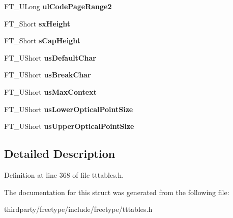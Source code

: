 \begin{DoxyCompactItemize}
\item 
\mbox{\label{struct_t_t___o_s2___ad117c64d73d15d1304c75fb5f41f1124}} 
F\+T\+\_\+\+U\+Long {\bfseries ul\+Code\+Page\+Range2}
\item 
\mbox{\label{struct_t_t___o_s2___a2eb3bb1392461a536c393304bde72835}} 
F\+T\+\_\+\+Short {\bfseries sx\+Height}
\item 
\mbox{\label{struct_t_t___o_s2___ac755913b648d535d1207927e4a6f1ec0}} 
F\+T\+\_\+\+Short {\bfseries s\+Cap\+Height}
\item 
\mbox{\label{struct_t_t___o_s2___af8639fefeb705a9287df996b224462ea}} 
F\+T\+\_\+\+U\+Short {\bfseries us\+Default\+Char}
\item 
\mbox{\label{struct_t_t___o_s2___a1d47030e246d2593ec3e4cdf66b17161}} 
F\+T\+\_\+\+U\+Short {\bfseries us\+Break\+Char}
\item 
\mbox{\label{struct_t_t___o_s2___a167313e407c77db2c4ca5a987f3a1482}} 
F\+T\+\_\+\+U\+Short {\bfseries us\+Max\+Context}
\item 
\mbox{\label{struct_t_t___o_s2___a76193c4f0a29357bab8d8d70af10121a}} 
F\+T\+\_\+\+U\+Short {\bfseries us\+Lower\+Optical\+Point\+Size}
\item 
\mbox{\label{struct_t_t___o_s2___a8b068c0e31e8c8de527f010b9860d2ae}} 
F\+T\+\_\+\+U\+Short {\bfseries us\+Upper\+Optical\+Point\+Size}
\end{DoxyCompactItemize}


\subsection{Detailed Description}


Definition at line 368 of file tttables.\+h.



The documentation for this struct was generated from the following file\+:\begin{DoxyCompactItemize}
\item 
thirdparty/freetype/include/freetype/tttables.\+h\end{DoxyCompactItemize}
